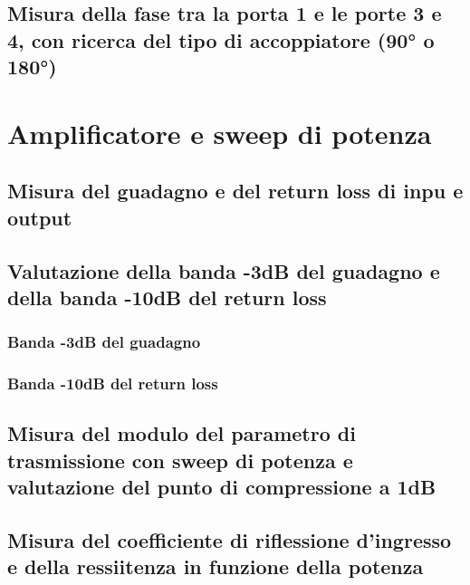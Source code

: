 \documentclass[11pt,a4paper,oneside]{book}
\begin{document}
\section{Misura della fase tra la porta 1 e le porte 3 e 4, con ricerca del tipo di accoppiatore (90° o 180°)}



\chapter{Amplificatore e sweep di potenza}

\section{Misura del guadagno e del return loss di inpu e output}

\section{Valutazione della banda -3dB del guadagno e della banda -10dB del return loss}
\subsection{Banda -3dB del guadagno}

\subsection{Banda -10dB del return loss}

\section{Misura del modulo del parametro di trasmissione con sweep di potenza e valutazione del punto di compressione a 1dB}

\section{Misura del coefficiente di riflessione d'ingresso e della ressiitenza in funzione della potenza}
\end{document}
